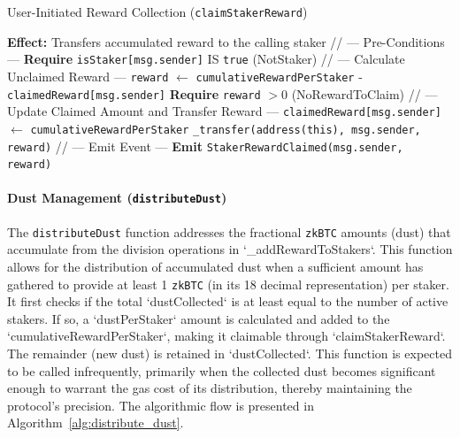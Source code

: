 \documentclass{DESSThesis}
\newcommand{\zktoken}{\texttt{zkBTC}}
\begin{document}
\begin{algorithm}[htbp]
\caption{User-Initiated Reward Collection (\texttt{claimStakerReward})}
\label{alg:claim_staker_reward}
\begin{algorithmic}[1]
        \State \textbf{Effect:} Transfers accumulated reward to the calling staker
        \State
        \State // --- Pre-Conditions ---
        \State \textbf{Require} \texttt{isStaker[msg.sender]} IS \texttt{true} (NotStaker)
        \State
        \State // --- Calculate Unclaimed Reward ---
        \State \texttt{reward} $\gets$ \texttt{cumulativeRewardPerStaker} - \texttt{claimedReward[msg.sender]}
        \State \textbf{Require} \texttt{reward} $> 0$ (NoRewardToClaim)
        \State
        \State // --- Update Claimed Amount and Transfer Reward ---
        \State \texttt{claimedReward[msg.sender]} $\gets$ \texttt{cumulativeRewardPerStaker}
        \State \texttt{\_transfer(address(this), msg.sender, reward)}
        \State
        \State // --- Emit Event ---
        \State \textbf{Emit} \texttt{StakerRewardClaimed(msg.sender, reward)}
    \EndProcedure
\end{algorithmic}
\end{algorithm}

\paragraph{Dust Management (\texttt{distributeDust})}
The \texttt{distributeDust} function addresses the fractional \texttt{\zktoken} amounts (dust) that accumulate from the division operations in `\_addRewardToStakers`. This function allows for the distribution of accumulated dust when a sufficient amount has gathered to provide at least 1 \texttt{\zktoken} (in its 18 decimal representation) per staker. It first checks if the total `dustCollected` is at least equal to the number of active stakers. If so, a `dustPerStaker` amount is calculated and added to the `cumulativeRewardPerStaker`, making it claimable through `claimStakerReward`. The remainder (new dust) is retained in `dustCollected`. This function is expected to be called infrequently, primarily when the collected dust becomes significant enough to warrant the gas cost of its distribution, thereby maintaining the protocol's precision. The algorithmic flow is presented in Algorithm~\ref{alg:distribute_dust}.
\end{document}

